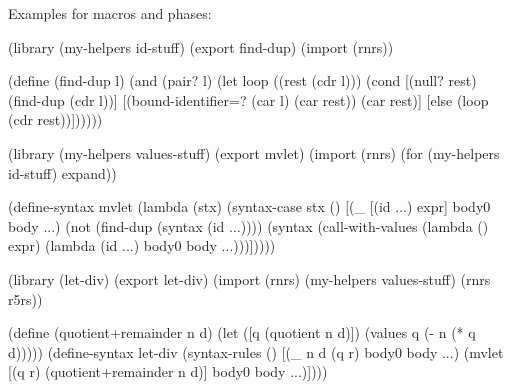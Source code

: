 Examples for macros and phases:

\begin{schemenoindent}
(library (my-helpers id-stuff)
  (export find-dup)
  (import (rnrs))

  (define (find-dup l)
    (and (pair? l)
         (let loop ((rest (cdr l)))
           (cond
            [(null? rest) (find-dup (cdr l))]
            [(bound-identifier=? (car l) (car rest)) 
             (car rest)]
            [else (loop (cdr rest))])))))

(library (my-helpers values-stuff)
  (export mvlet)
  (import (rnrs) (for (my-helpers id-stuff) expand))

  (define-syntax mvlet
    (lambda (stx)
      (syntax-case stx ()
        [(\_ [(id ...) expr] body0 body ...)
         (not (find-dup (syntax (id ...))))
         (syntax
           (call-with-values
               (lambda () expr) 
             (lambda (id ...) body0 body ...)))]))))

(library (let-div)
  (export let-div)
  (import (rnrs)
          (my-helpers values-stuff)
          (rnrs r5rs))

  (define (quotient+remainder n d)
    (let ([q (quotient n d)])
      (values q (- n (* q d)))))
  (define-syntax let-div
    (syntax-rules ()
     [(\_ n d (q r) body0 body ...)
      (mvlet [(q r) (quotient+remainder n d)]
        body0 body ...)])))%
\end{schemenoindent}



